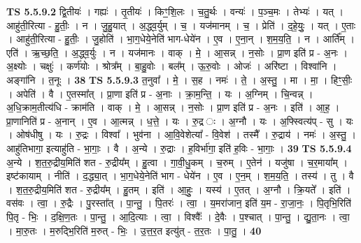 \documentclass[17pt]{extarticle}
\begin{document}
                  \newline
                                \textbf{ TS 5.5.9.2} \newline
                  द्वि॒तीयः॑ । गह्यः॑ । तृ॒तीयः॑ । किꣳ॒॒शि॒लः । च॒तु॒र्थः । वन्यः॑ । प॒ञ्च॒मः । तेभ्यः॑ । यत् । आहु॑ती॒रित्या - हु॒तीः॒ । न । जु॒हु॒यात् । अ॒द्ध्व॒र्युम् । च॒ । यज॑मानम् । च॒ । प्रेति॑ । द॒हे॒युः॒ । यत् । ए॒ताः । आहु॑ती॒रित्या - हु॒तीः॒ । जु॒होति॑ । भा॒ग॒धेये॒नेति॑ भाग-धेये॑न । ए॒व । ए॒ना॒न् । श॒म॒य॒ति॒ । न । आर्ति᳚म् । एति॑ । ऋ॒च्छ॒ति॒ । अ॒द्ध्व॒र्युः । न । यज॑मानः । वाक् । मे॒ । आ॒सन्न् । न॒सोः । प्रा॒ण इति॑ प्र - अ॒नः । अ॒क्ष्योः । चक्षुः॑ । कर्ण॑योः । श्रोत्र᳚म् । बा॒हु॒वोः । बल᳚म् । ऊ॒रु॒वोः । ओजः॑ । अरि॑ष्टा । विश्वा॑नि । अङ्गा॑नि । त॒नूः । \textbf{  38} \newline
                  \newline
                                \textbf{ TS 5.5.9.3} \newline
                  त॒नुवा᳚ । मे॒ । स॒ह । नमः॑ । ते॒ । अ॒स्तु॒ । मा । मा॒ । हिꣳ॒॒सीः॒ । अपेति॑ । वै । ए॒तस्मा᳚त् । प्रा॒णा इति॑ प्र - अ॒नाः । क्रा॒म॒न्ति॒ । यः । अ॒ग्निम् । चि॒न्वन्न् । अ॒धि॒क्राम॒तीत्य॑धि - क्राम॑ति । वाक् । मे॒ । आ॒सन्न् । न॒सोः । प्रा॒ण इति॑ प्र - अ॒नः । इति॑ । आ॒ह॒ । प्रा॒णानिति॑ प्र - अ॒नान् । ए॒व । आ॒त्मन्न् । ध॒त्ते॒ । यः । रु॒द्र ः । अ॒ग्नौ । यः । अ॒फ्स्वित्य॑प् - सु । यः । ओष॑धीषु । यः । रु॒द्रः । विश्वा᳚ । भुव॑ना । आ॒वि॒वेशेत्या᳚ - वि॒वेश॑ । तस्मै᳚ । रु॒द्राय॑ । नमः॑ । अ॒स्तु॒ । आहु॑तिभागा॒ इत्याहु॑ति - भा॒गाः॒ । वै । अ॒न्ये । रु॒द्राः । ह॒विर्भा॑गा॒ इति॑ ह॒विः - भा॒गाः॒ । \textbf{  39} \newline
                  \newline
                                \textbf{ TS 5.5.9.4} \newline
                  अ॒न्ये । श॒त॒रु॒द्रीय॒मिति॑ शत - रु॒द्रीय᳚म् । हु॒त्वा । गा॒वी॒धु॒कम् । च॒रुम् । ए॒तेन॑ । यजु॑षा । च॒र॒माया᳚म् । इष्ट॑कायाम् । नीति॑ । द॒द्ध्या॒त् । भा॒ग॒धेये॒नेति॑ भाग - धेये॑न । ए॒व । ए॒न॒म् । श॒म॒य॒ति॒ । तस्य॑ । तु । वै । श॒त॒रु॒द्रीय॒मिति॑ शत - रु॒द्रीय᳚म् । हु॒तम् । इति॑ । आ॒हुः॒ । यस्य॑ । ए॒तत् । अ॒ग्नौ । क्रि॒यते᳚ । इति॑ । वस॑वः । त्वा॒ । रु॒द्रैः । पु॒रस्ता᳚त् । पा॒न्तु॒ । पि॒तरः॑ । त्वा॒ । य॒मरा॑जान॒ इति॑ य॒म - रा॒जा॒नः॒ । पि॒तृभि॒रिति॑ पि॒तृ - भिः॒ । द॒क्षि॒ण॒तः । पा॒न्तु॒ । आ॒दि॒त्याः । त्वा॒ । विश्वैः᳚ । दे॒वैः । प॒श्चात् । पा॒न्तु॒ । द्यु॒ता॒नः । त्वा॒ । मा॒रु॒तः । म॒रुद्भि॒रिति॑ म॒रुत् - भिः॒ । उ॒त्त॒र॒त इत्यु॑त् - त॒र॒तः । पा॒तु॒ । \textbf{  40} \newline
                  \newline
\end{document}
